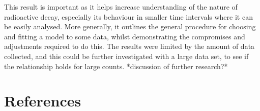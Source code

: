 \documentclass[11pt]{article}
\begin{document}
\noindent This result is important as it helps increase understanding of the nature of radioactive decay, especially its behaviour in smaller time intervals where it can be easily analysed. More generally, it outlines the general procedure for choosing and fitting a model to some data, whilst demonstrating the compromises and adjustments required to do this. The results were limited by the amount of data collected, and this could be further investigated with a large data set, to see if the relationship holds for large counts. 
*discussion of further research?*
    \section{References}
\end{document}
